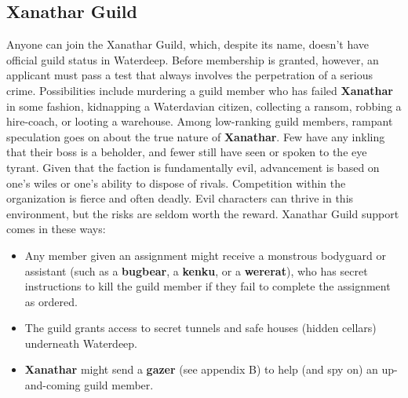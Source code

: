 \documentclass[10pt,a4paper,twoside,twocolumn,openany,nodeprecatedcode]{dndbook}
\begin{document}
\subsection{Xanathar Guild}
Anyone can join the Xanathar Guild, which, despite its name, doesn't have official guild status in Waterdeep. Before membership is granted, however, an applicant must pass a test that always involves the perpetration of a serious crime. Possibilities include murdering a guild member who has failed \textbf{Xanathar} in some fashion, kidnapping a Waterdavian citizen, collecting a ransom, robbing a hire-coach, or looting a warehouse.
Among low-ranking guild members, rampant speculation goes on about the true nature of \textbf{Xanathar}. Few have any inkling that their boss is a beholder, and fewer still have seen or spoken to the eye tyrant.
Given that the faction is fundamentally evil, advancement is based on one's wiles or one's ability to dispose of rivals. Competition within the organization is fierce and often deadly. Evil characters can thrive in this environment, but the risks are seldom worth the reward.
Xanathar Guild support comes in these ways:
\begin{itemize}

\item Any member given an assignment might receive a monstrous bodyguard or assistant (such as a \textbf{bugbear}, a \textbf{kenku}, or a \textbf{wererat}), who has secret instructions to kill the guild member if they fail to complete the assignment as ordered.
\item The guild grants access to secret tunnels and safe houses (hidden cellars) underneath Waterdeep.
\item \textbf{Xanathar} might send a \textbf{gazer} (see appendix B) to help (and spy on) an up-and-coming guild member.
\end{itemize}
\end{document}
